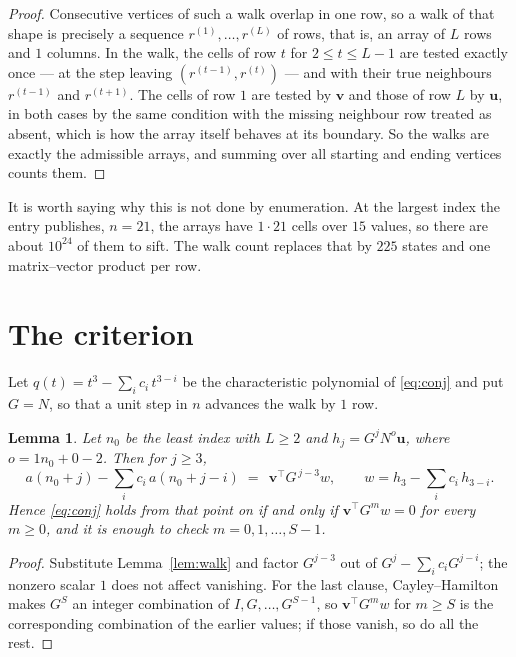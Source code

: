 \documentclass[11pt,a4paper]{article}
\theoremstyle{plain}
\newtheorem{lemma}[theorem]{Lemma}
\theoremstyle{definition}
\begin{document}
\begin{proof}
Consecutive vertices of such a walk overlap in one row, so a walk of that shape is
precisely a sequence $r^{(1)},\dots,r^{(L)}$ of rows, that is, an array of $L$ rows
and $1$ columns. In the walk, the cells of row $t$ for $2\le t\le L-1$ are tested
exactly once --- at the step leaving $(r^{(t-1)},r^{(t)})$ --- and with their true
neighbours $r^{(t-1)}$ and $r^{(t+1)}$. The cells of row $1$ are tested by
$\mathbf{v}$ and those of row $L$ by $\mathbf{u}$, in both cases by the same condition
with the missing neighbour row treated as absent, which is how the array itself behaves at
its boundary. So the walks are exactly the admissible arrays, and summing over all starting
and ending vertices counts them.
\end{proof}


It is worth saying why this is not done by enumeration. At the largest index the entry
publishes, $n=21$, the arrays have $1\cdot21$ cells over
$15$ values, so there are about $10^{24}$ of them to sift. The
walk count replaces that by $225$ states and one matrix--vector product per row.
\section{The criterion}

Let $q(t)=t^{3}-\sum_i c_i\,t^{3-i}$ be the characteristic polynomial of
\eqref{eq:conj} and put $G=N$, so that a unit step in $n$ advances the walk by
$1$ row.

\begin{lemma}\label{lem:crit}
Let $n_0$ be the least index with $L\ge2$ and $h_j=G^{j}N^{o}\mathbf{u}$, where
$o=1n_0+0-2$. Then for $j\ge3$,
\[
a(n_0+j)-\sum_i c_i\,a(n_0+j-i)\;=\;\,\mathbf{v}^{\!\top}G^{\,j-3}w,
\qquad w=h_{3}-\sum_i c_i\,h_{3-i} .
\]
Hence \eqref{eq:conj} holds from that point on if and only if
$\mathbf{v}^{\!\top}G^{m}w=0$ for every $m\ge0$, and it is enough to check
$m=0,1,\dots,S-1$.
\end{lemma}

\begin{proof}
Substitute Lemma~\ref{lem:walk} and factor $G^{j-3}$ out of
$G^{j}-\sum_ic_iG^{j-i}$; the nonzero scalar $1$ does not affect
vanishing. For the last clause, Cayley--Hamilton makes $G^{S}$ an integer combination of
$I,G,\dots,G^{S-1}$, so $\mathbf{v}^{\!\top}G^{m}w$ for $m\ge S$ is the corresponding
combination of the earlier values; if those vanish, so do all the rest.
\end{proof}
\end{document}
